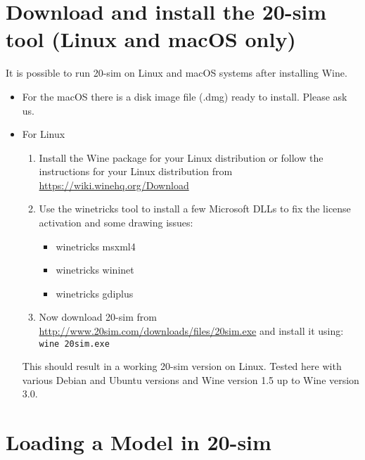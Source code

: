 \documentclass[11pt,a4paper]{../tutorial}
\newcommand{\tsimurl}{http://www.20sim.com/downloads/files/20sim.exe}
\begin{document}
\section{Download and install the 20-sim tool (Linux and macOS only)}

It is possible to run 20-sim on Linux and macOS systems after installing Wine.
\begin{itemize}
	\item For the macOS there is a disk image file (.dmg) ready to install. Please ask
us. 
	\item For Linux 
		\begin{enumerate} 
			\item Install the Wine package for your Linux distribution or follow the instructions for your Linux distribution from \url{https://wiki.winehq.org/Download}
    			\item Use the winetricks tool to install a few Microsoft DLLs to fix the license activation and some drawing issues:
        			\begin{itemize}
					\item winetricks msxml4
					\item winetricks wininet
					\item winetricks gdiplus 
				\end{itemize}
			\item Now download 20-sim from \url{\tsimurl} and install it using: \verb'wine 20sim.exe'
		\end{enumerate}

This should result in a working 20-sim version on Linux. Tested here with various Debian and Ubuntu versions and Wine version 1.5 up to Wine version 3.0.
\end{itemize}

\newpage 

\section{Loading a Model in 20-sim}
\end{document}

